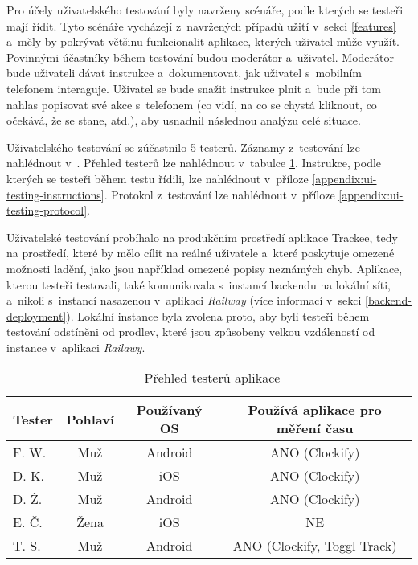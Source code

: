 Pro účely uživatelského testování byly navrženy scénáře, podle kterých se testeři mají řídit. Tyto scénáře vycházejí z~navržených případů užití v~sekci \ref{features} a~měly by pokrývat většinu funkcionalit aplikace, kterých uživatel může využít. Povinnými účastníky během testování budou moderátor a~uživatel. Moderátor bude uživateli dávat instrukce a~dokumentovat, jak uživatel s~mobilním telefonem interaguje. Uživatel se bude snažit instrukce plnit a~bude při tom nahlas popisovat své akce s~telefonem (co vidí, na co se chystá kliknout, co očekává, že se stane, atd.), aby usnadnil následnou analýzu celé situace. 

Uživatelského testování se zúčastnilo 5 testerů. Záznamy z~testování lze nahlédnout v~\cite{ui-testing-playlist}. Přehled testerů lze nahlédnout v~tabulce \ref{table:testers}. Instrukce, podle kterých se testeři během testu řídili, lze nahlédnout v~příloze \ref{appendix:ui-testing-instructions}. Protokol z~testování lze nahlédnout v~příloze \ref{appendix:ui-testing-protocol}.

Uživatelské testování probíhalo na produkčním prostředí aplikace Trackee, tedy na prostředí, které by mělo cílit na reálné uživatele a~které poskytuje omezené možnosti ladění, jako jsou například omezené popisy neznámých chyb. Aplikace, kterou testeři testovali, také komunikovala s~instancí backendu na lokální síti, a~nikoli s~instancí nasazenou v~aplikaci \emph{Railway} (více informací v~sekci \ref{backend-deployment}). Lokální instance byla zvolena proto, aby byli testeři během testování odstíněni od prodlev, které jsou způsobeny velkou vzdáleností od instance v~aplikaci \emph{Railawy}.

\begin{table}\centering
\begin{tabular}{l|c|c|c}
	Tester		& Pohlaví	& Používaný OS	& Používá aplikace pro měření času	\tabularnewline \hline 
 	F. W.		& Muž		& Android       & ANO (Clockify)	                \tabularnewline \hline
	D. K.		& Muž		& iOS	        & ANO (Clockify)                	\tabularnewline \hline
	D. Ž.		& Muž		& Android       & ANO (Clockify)               		\tabularnewline \hline
	E. Č.		& Žena		& iOS	        & NE 	                	        \tabularnewline \hline
	T. S.		& Muž		& Android       & ANO (Clockify, Toggl Track)	    \tabularnewline \hline
\end{tabular}
\vspace{0.5cm}
\caption[Přehled testerů aplikace]{~Přehled testerů aplikace}\label{table:testers}
\end{table} 

